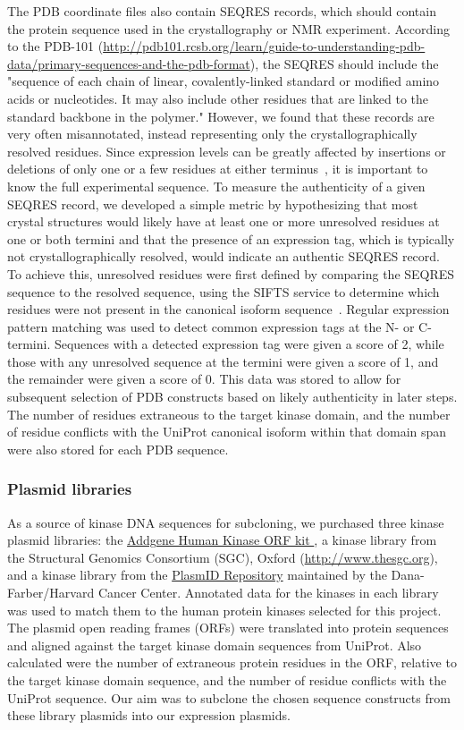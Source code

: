 \documentclass[phd,tocprelim]{cornell}
\begin{document}
The PDB coordinate files also contain SEQRES records, which should contain the protein sequence used in the crystallography or NMR experiment.
According to the PDB-101 (\url{http://pdb101.rcsb.org/learn/guide-to-understanding-pdb-data/primary-sequences-and-the-pdb-format}), the SEQRES should include the "sequence of each chain of linear, covalently-linked standard or modified amino acids or nucleotides. It may also include other residues that are linked to the standard backbone in the polymer." However, we found that these records are very often misannotated, instead representing only the crystallographically resolved residues.
Since expression levels can be greatly affected by insertions or deletions of only one or a few residues at either terminus~\citep{klock_combining_2008}, it is important to know the full experimental sequence. To measure the authenticity of a given SEQRES record, we developed a simple metric by hypothesizing that most crystal structures would likely have at least one or more unresolved residues at one or both termini and that the presence of an expression tag, which is typically not crystallographically resolved, would indicate an authentic SEQRES record.
To achieve this, unresolved residues were first defined by comparing the SEQRES sequence to the resolved sequence, using the SIFTS service to determine which residues were not present in the canonical isoform sequence~\citep{doi:10.1093/nar/gks1258}.
Regular expression pattern matching was used to detect common expression tags at the N- or C-termini.
Sequences with a detected expression tag were given a score of 2, while those with any unresolved sequence at the termini were given a score of 1, and the remainder were given a score of 0.
This data was stored to allow for subsequent selection of PDB constructs based on likely authenticity in later steps. The number of residues extraneous to the target kinase domain, and the number of residue conflicts with the UniProt canonical isoform within that domain span were also stored for each PDB sequence. 

\subsubsection{Plasmid libraries}

As a source of kinase DNA sequences for subcloning, we purchased three kinase plasmid libraries: the \href{https://www.addgene.org/human-kinase/}{Addgene Human Kinase ORF kit }, a kinase library from the Structural Genomics Consortium (SGC), Oxford (\url{http://www.thesgc.org}), and a kinase library from the \href{https://plasmid.med.harvard.edu/PLASMID/Home.xhtml}{PlasmID Repository} maintained by the Dana-Farber/Harvard Cancer Center. Annotated data for the kinases in each library was used to match them to the human protein kinases selected for this project.
The plasmid open reading frames (ORFs) were translated into protein sequences and aligned against the target kinase domain sequences from UniProt.
Also calculated were the number of extraneous protein residues in the ORF, relative to the target kinase domain sequence, and the number of residue conflicts with the UniProt sequence. Our aim was to subclone the chosen sequence constructs from these library plasmids into our expression plasmids. 
\end{document}
